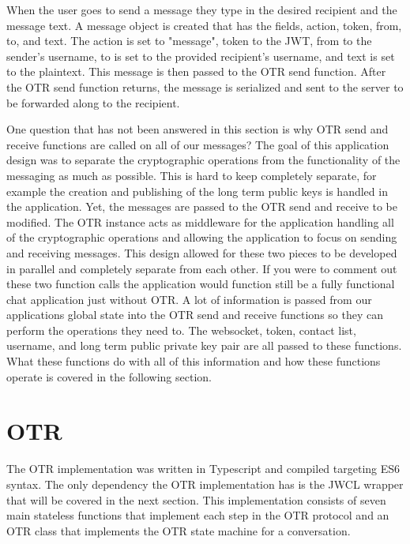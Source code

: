 When the user goes to send a message they type in the desired recipient and the message text.
A message object is created that has the fields, action, token, from, to, and text. The action is set to "message", token to the JWT, from to the sender's username, to is set to the provided recipient's username, and text is set to the plaintext. This message is then passed to the OTR send function. After the OTR send function returns, the message is serialized and sent to the server to be forwarded along to the recipient.


One question that has not been answered in this section is why OTR send and receive functions are called on all of our messages? The goal of this application design was to separate the cryptographic operations from the functionality of the messaging as much as possible. This is hard to keep completely separate, for example the creation and publishing of the long term public keys is handled in the application. Yet, the messages are passed to the OTR send and receive to be modified. The OTR instance acts as middleware for the application handling all of the cryptographic operations and allowing the application to focus on sending and receiving messages. This design allowed for these two pieces to be developed in parallel and completely separate from each other. If you were to comment out these two function calls the application would function still be a fully functional chat application just without OTR. A lot of information is passed from our applications global state into the OTR send and receive functions so they can perform the operations they need to. The websocket, token, contact list, username, and long term public private key pair are all passed to these functions. What these functions do with all of this information and how these functions operate is covered in the following section.


\section{OTR}


The OTR implementation was written in Typescript and compiled targeting ES6 syntax. The only dependency the OTR implementation has is the JWCL wrapper that will be covered in the next section. This implementation consists of seven main stateless functions that implement each step in the OTR protocol and an OTR class that implements the OTR state machine for a conversation. 



